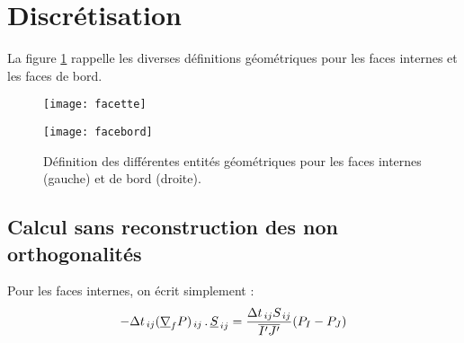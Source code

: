 
%
%
%
%



\hypertarget{cs\_face\_diffusion\_potential}{}

\vspace{1cm}

\section*{Discrétisation}

La figure \ref{Base_Itrmas_fig_geom} rappelle les diverses définitions géométriques
pour les faces internes et les faces de bord.

\begin{figure}[h]
\parbox{8cm}{%
\centerline{\texttt{[image: facette]}}}
\parbox{8cm}{%
\centerline{\texttt{[image: facebord]}}}
\caption{\label{Base_Itrmas_fig_geom}Définition des différentes entités
géométriques pour les faces internes (gauche) et de bord (droite).}
\end{figure}


\subsection*{Calcul sans reconstruction des non orthogonalités}
Pour les faces internes, on écrit simplement :
\begin{equation}
\label{Base_Itrmas_eq_intssrec}
-\Delta t_{\,ij}(\underline{\nabla}_f P)_{\,ij}\,.\,\underline{S}_{\,ij}=
\frac{\Delta t_{\,ij}S_{\,ij}}{\overline{I^\prime J^\prime}}(P_I-P_J)
\end{equation}

